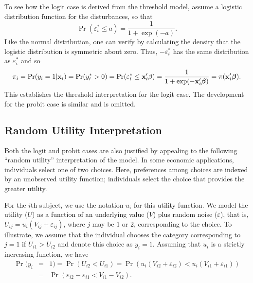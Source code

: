 To see how the logit case is derived from the threshold model,
assume a logistic distribution function for the disturbances, so that
\begin{equation*}
\mathrm{\Pr }(\varepsilon_i^{\ast}\leq a)=\frac{1}{1+\exp (-a)}.
\end{equation*}
Like the normal distribution, one can verify by calculating the density that the logistic distribution
is symmetric about zero. Thus, $-\varepsilon_i^{\ast}$ has the same distribution as $\varepsilon_i^{\ast}$ and so
\begin{equation*}
\pi_i=\Pr (y_i=1|\mathbf{x}_i)=\mathrm{\Pr }(y_i^{\ast}>0)=\mathrm{%
\Pr }(\varepsilon_i^{\ast}\leq \mathbf{x}_i^{\mathbf{\prime}}\mathbf{%
\beta })=\frac{1}{1+\exp (-\mathbf{x}_i^{\mathbf{\prime}}\boldsymbol \beta)}%
=\mathrm{\pi }(\mathbf{x}_i^{\mathbf{\prime}}\boldsymbol \beta).
\end{equation*}
This establishes the threshold interpretation for the logit case.
The development for the probit case is similar and is omitted.

\subsection{Random Utility Interpretation}

Both the logit and probit cases are also justified by appealing
to the following ``random utility'' interpretation of the model. In
some economic applications, individuals select one of two choices.
Here, preferences among choices are indexed by an unobserved utility
function; individuals select the choice that provides the greater
utility.

For the $i$th subject, we use the notation $u_i$ for this utility function.
We model the utility ($U$) as a function of an underlying value ($V$) plus random
noise ($\varepsilon$), that is, $U_{ij}=u_i(V_{ij}+\varepsilon_{ij})$, where $j$ may
be 1 or 2, corresponding to the choice. To illustrate, we assume
that the individual chooses the category corresponding to $j=1$ if
$U_{i1}>U_{i2}$ and denote this choice as $y_i=1$. Assuming that
$u_i$ is a strictly increasing function, we have
\begin{eqnarray*}
\Pr (y_i &=&1)=\mathrm{\Pr }(U_{i2}<U_{i1})=\mathrm{\Pr }\left(
u_i(V_{i2}+\varepsilon_{i2})<u_i(V_{i1}+\varepsilon_{i1})\right) \\
&=&\mathrm{\Pr }(\varepsilon_{i2}-\varepsilon_{i1}<V_{i1}-V_{i2}).
\end{eqnarray*}

